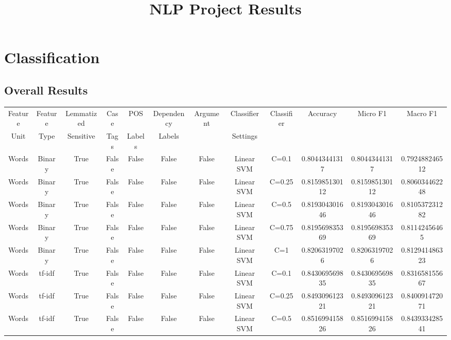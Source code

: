 \documentclass[11pt]{article}
\newcommand{\headcol}{\rowcolor{tableheadcolor}} %
\begin{document}
  \title{NLP Project Results}

  \maketitle
 
 \section{Classification}
\subsection{Overall Results}
    
  \begin{tabular}{|c|c|c|c|c|c|c|c|c|c|c|c|}
  \hline
  \headcol \color{white}  Feature  & \color{white}  Feature  &  \color{white}  Lemmatized & \color{white}  Case  & \color{white}   POS  & \color{white}   Dependency  &  \color{white}  Argument  &  \color{white}  Classifier &  \color{white}  Classifier  & \color{white}  Accuracy & \color{white}  Micro F1 & \color{white}  Macro F1 \\
\headcol  \color{white}  Unit &  \color{white}  Type & \color{white}  Sensitive &  \color{white} Tags &  \color{white} Labels &  \color{white} Labels & & \color{white} Settings & & & &  \\
  \hline
 Words & Binary & True & False & False & False & False & Linear SVM & C=0.1 & 0.80443441317 & 0.80443441317 & 0.792488246512 \\ 
Words & Binary & True & False & False & False & False & Linear SVM & C=0.25 & 0.815985130112 & 0.815985130112 & 0.806034462248 \\ 
Words & Binary & True & False & False & False & False & Linear SVM & C=0.5 & 0.819304301646 & 0.819304301646 & 0.810537231282 \\ 
Words & Binary & True & False & False & False & False & Linear SVM & C=0.75 & 0.819569835369 & 0.819569835369 & 0.81142456465 \\ 
Words & Binary & True & False & False & False & False & Linear SVM & C=1 & 0.82063197026 & 0.82063197026 & 0.812941486323 \\ 
Words & tf-idf & True & False & False & False & False & Linear SVM & C=0.1 & 0.843069569835 & 0.843069569835 & 0.831658155667 \\ 
Words & tf-idf & True & False & False & False & False & Linear SVM & C=0.25 & 0.849309612321 & 0.849309612321 & 0.840091472071 \\ 
Words & tf-idf & True & False & False & False & False & Linear SVM & C=0.5 & 0.851699415826 & 0.851699415826 & 0.843933428541 \\ 

\end{tabular}
\end{document}
